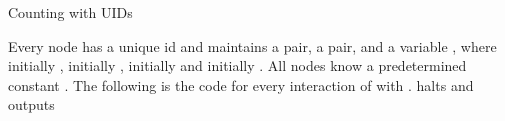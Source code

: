 \documentclass[oribibl, 11pt]{llncs}
\begin{document}
\renewcommand{\algorithmiccomment}[1]{// #1}
\begin{algorithm*}\caption{Counting with UIDs}\label{prot:count-ids}
  \begin{algorithmic}[1]
    \Require Every node  has a unique id  and maintains a  pair, a  pair, and a variable , where  initially ,  initially ,  initially  and  initially . All nodes know a predetermined constant . The following is the code for every interaction of  with .
    \If {}
        \State 
    \EndIf
    \If {}
            \State 
	    \State 
	    \State 
        \EndIf
        \If {}
	    \State 
        \EndIf
	    \State 
	    \State 
	    \If {}
	        \State  halts and outputs 
	    \EndIf
        \EndIf
    \EndIf
  \end{algorithmic}
\end{algorithm*}
\end{document}
